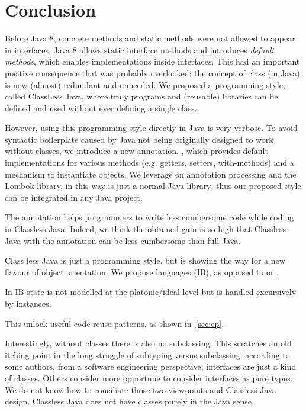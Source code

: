 \section{Conclusion}\label{sec:conclusion}


Before Java 8, concrete methods and static methods were not allowed
to appear in interfaces.  Java 8 allows static interface methods and
introduces \emph{default methods}, which enables implementations
inside interfaces. This had an important positive consequence that
was probably overlooked: the concept of class
(in Java) is now (almost) redundant and unneeded.
We proposed a programming style, called ClassLess Java, where
truly \objectoriented programs and (reusable) libraries
can be defined and used without ever defining a single class.

However, using this programming style directly in Java is very verbose.
To avoid syntactic boilerplate
caused by Java not being originally designed to work without classes,
we introduce a new annotation, \mixin, which provides default implementations
for various methods (e.g. getters, setters, with-methods) and a
mechanism to instantiate objects. 
We leverage on annotation processing and the Lombok library, in this way
\mixin is just a normal Java library; thus our proposed style can be integrated
in any Java project.

The \mixin annotation helps programmers
to write less cumbersome code while coding in Classless Java. Indeed, 
we think the obtained gain is so high that Classless Java with the \mixin
annotation can be less cumbersome than full Java.


Class less Java is just a programming style, but is 
showing the way for a new flavour of object orientation:
We propose \interfacebased \objectoriented languages (IB),
as opposed to \classbased or \prototypebased.

In IB state is not modelled at the platonic/ideal level
but is handled excursively by instances.

This unlock useful code reuse patterns, as shown in~\ref{sec:ep}.



Interestingly, without classes there is also no subclassing. This scratches an old
  itching point in the long struggle of subtyping versus subclassing:
  according to some authors, from a software engineering perspective,
  interfaces are just a kind of classes. Others consider more
  opportune to consider interfaces as pure types. We do not know how to conciliate
  those two viewpoints and Classless Java design.
  Classless Java does not have classes purely in the Java sense.  


